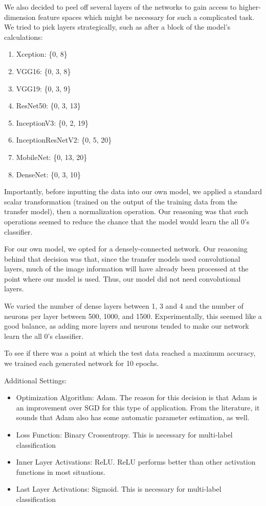 \documentclass{article}
\begin{document}
We also decided to peel off several layers of the networks to gain access to higher-dimension feature spaces which might be necessary for such a complicated task. We tried to pick layers strategically, such as after a block of the model's calculations:

\begin{enumerate}
	\item Xception: \{0, 8\}
	\item VGG16: \{0, 3, 8\}
	\item VGG19: \{0, 3, 9\}
	\item ResNet50: \{0, 3, 13\}
	\item InceptionV3: \{0, 2, 19\}
	\item InceptionResNetV2: \{0, 5, 20\}
	\item MobileNet: \{0, 13, 20\}
	\item DenseNet: \{0, 3, 10\}
\end{enumerate}

Importantly, before inputting the data into our own model, we applied a standard scalar transformation (trained on the output of the training data from the transfer model), then a normalization operation. Our reasoning was that such operations seemed to reduce the chance that the model would learn the all 0's classifier.

For our own model, we opted for a densely-connected network. Our reasoning behind that decision was that, since the transfer models used convolutional layers, much of the image information will have already been processed at the point where our model is used. Thus, our model did not need convolutional layers.

We varied the number of dense layers between 1, 3 and 4 and the number of neurons per layer between 500, 1000, and 1500. Experimentally, this seemed like a good balance, as adding more layers and neurons tended to make our network learn the all 0's classifier.

To see if there was a point at which the test data reached a maximum accuracy, we trained each generated network for 10 epochs.

Additional Settings:

\begin{itemize}
	\item Optimization Algorithm: Adam. The reason for this decision is that Adam is an improvement over SGD for this type of application. From the literature, it sounds that Adam also has some automatic parameter estimation, as well.
	\item Loss Function: Binary Crossentropy. This is necessary for multi-label classification
	\item Inner Layer Activations: ReLU. ReLU performs better than other activation functions in most situations.
	\item Last Layer Activations: Sigmoid. This is necessary for multi-label classification
\end{itemize}
\end{document}
